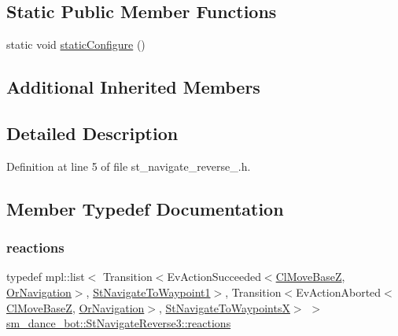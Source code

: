 \subsection*{Static Public Member Functions}
\begin{DoxyCompactItemize}
\item 
static void \hyperlink{structsm__dance__bot_1_1StNavigateReverse3_a01fcc1e52c2bc616febfc19c01c72612}{static\+Configure} ()
\end{DoxyCompactItemize}
\subsection*{Additional Inherited Members}


\subsection{Detailed Description}


Definition at line 5 of file st\+\_\+navigate\+\_\+reverse\+\_.\+h.



\subsection{Member Typedef Documentation}
\mbox{\label{structsm__dance__bot_1_1StNavigateReverse3_ab55c811a489098c4f9fb1cd8db2da32f}} 
\subsubsection{\texorpdfstring{reactions}{reactions}}
{\footnotesize\ttfamily typedef mpl\+::list$<$ Transition$<$Ev\+Action\+Succeeded$<$\hyperlink{classmove__base__z__client_1_1ClMoveBaseZ}{Cl\+Move\+BaseZ}, \hyperlink{classsm__dance__bot_1_1OrNavigation}{Or\+Navigation}$>$, \hyperlink{structsm__dance__bot_1_1StNavigateToWaypoint1}{St\+Navigate\+To\+Waypoint1}$>$, Transition$<$Ev\+Action\+Aborted$<$\hyperlink{classmove__base__z__client_1_1ClMoveBaseZ}{Cl\+Move\+BaseZ}, \hyperlink{classsm__dance__bot_1_1OrNavigation}{Or\+Navigation}$>$, \hyperlink{structsm__dance__bot_1_1StNavigateToWaypointsX}{St\+Navigate\+To\+WaypointsX}$>$ $>$ \hyperlink{structsm__dance__bot_1_1StNavigateReverse3_ab55c811a489098c4f9fb1cd8db2da32f}{sm\+\_\+dance\+\_\+bot\+::\+St\+Navigate\+Reverse3\+::reactions}}



